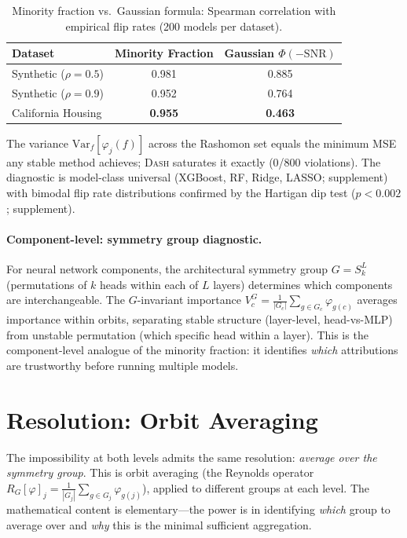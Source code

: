 \documentclass{article}
\newcommand{\Var}{\mathrm{Var}}
\newcommand{\DASH}{\textsc{Dash}}
\begin{document}
\begin{table}[t]
\centering
\caption{Minority fraction vs.\ Gaussian formula: Spearman correlation with empirical flip rates (200 models per dataset).}
\label{tab:cc-comparison}
\small
\begin{tabular}{@{}lcc@{}}
\toprule
Dataset & Minority Fraction & Gaussian $\Phi(-\text{SNR})$ \\
\midrule
Synthetic ($\rho = 0.5$) & 0.981 & 0.885 \\
Synthetic ($\rho = 0.9$) & 0.952 & 0.764 \\
California Housing & \textbf{0.955} & \textbf{0.463} \\
\bottomrule
\end{tabular}
\end{table}

The variance $\Var_f[\varphi_j(f)]$ across the Rashomon set equals the minimum MSE any stable method achieves; \DASH{} saturates it exactly (0/800 violations). The diagnostic is model-class universal (XGBoost, RF, Ridge, LASSO; supplement) with bimodal flip rate distributions confirmed by the Hartigan dip test ($p < 0.002$; supplement).

\paragraph{Component-level: symmetry group diagnostic.}
For neural network components, the architectural symmetry group $G = S_k^L$ (permutations of $k$ heads within each of $L$ layers) determines which components are interchangeable. The $G$-invariant importance $V^G_c = \frac{1}{|G_c|}\sum_{g \in G_c} \varphi_{g(c)}$ averages importance within orbits, separating stable structure (layer-level, head-vs-MLP) from unstable permutation (which specific head within a layer). This is the component-level analogue of the minority fraction: it identifies \emph{which} attributions are trustworthy before running multiple models.

\section{Resolution: Orbit Averaging}
\label{sec:resolution}

The impossibility at both levels admits the same resolution: \emph{average over the symmetry group}. This is orbit averaging (the Reynolds operator $R_G[\varphi]_j = \frac{1}{|G_j|}\sum_{g \in G_j} \varphi_{g(j)}$), applied to different groups at each level. The mathematical content is elementary---the power is in identifying \emph{which} group to average over and \emph{why} this is the minimal sufficient aggregation.
\end{document}
